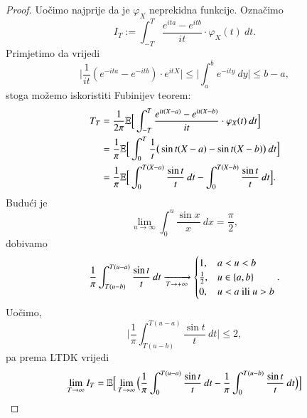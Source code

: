 \begin{proof}
    Uo\v cimo najprije da je $\varphi_X$ neprekidna funkcije.
    Ozna\v cimo
    \begin{equation*}
        I_T := \int_{-T}^T \frac{e^{ita} - e^{itb}}{it} \cdot \varphi_X (t) \: d t.
    \end{equation*}
    Primjetimo da vrijedi
    \begin{equation*}
        \Big| \frac{1}{i t} (e^{- i t a} - e^{- i t b}) \cdot e^{i t X} \Big| \leq \Big| \int_a^b e^{-ity} \: d y \Big| \leq b - a,
    \end{equation*}
    stoga mo\v zemo iskoristiti Fubinijev teorem:
    \begin{equation*}
        \begin{aligned}
            T_T &= \frac{1}{2 \pi} \mathbb{E} \Big[ \int_{-T}^T \frac{e^{it(X - a)} - e^{it(X - b)}}{it} \cdot \varphi_X (t) \: d t \Big]\\
            &= \frac{1}{\pi} \mathbb{E} \Big[ \int_0^T \frac{1}{t} \big( \sin t(X-a) - \sin t(X-b) \big) \: d t \Big]\\
            &= \frac{1}{\pi} \mathbb{E} \Big[ \int_0^{T(X-a)} \frac{\sin t}{t} \: d t - \int_0^{T (X-b)} \frac{\sin t}{t} \: d t \Big].
        \end{aligned}
    \end{equation*}
    Budu\' ci je
    \begin{equation*}
        \lim\limits_{u \to \infty} \int_0^u \frac{\sin x}{x} \: d x = \frac{\pi}{2},
    \end{equation*}
    dobivamo
    \begin{equation*}
        \frac{1}{\pi} \int_{T (u - b)}^{T (u - a)} \frac{\sin t}{t} \: dt \xrightarrow[T \to + \infty]{}
        \begin{cases}
            1,    &a < u < b\\
            \frac{1}{2}, &u \in \{a, b\}\\
            0,    &u < a \textnormal{ ili } u > b
        \end{cases}.
    \end{equation*}
    Uo\v cimo,
    \begin{equation*}
        \Big| \frac{1}{\pi} \int_{T (u- b)}^{T (u - a)} \frac{\sin t}{t} \: d t \Big| \leq 2,
    \end{equation*}
    pa prema LTDK vrijedi
    \begin{equation*}
        \begin{aligned}
            \lim\limits_{T \to \infty} I_T &= \masE \Big[ \lim\limits_{T \to \infty} \Big( \frac{1}{\pi} \int_0^{T (u - a)} \frac{\sin t}{t} \: dt - \frac{1}{\pi} \int_0^{T (u - b)} \frac{\sin t}{t} \: d t \Big) \Big]\\

\end{aligned}
\end{equation*}
\end{proof}
